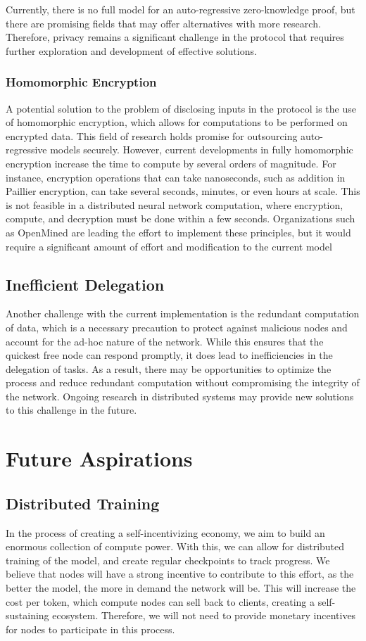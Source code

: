 \documentclass{article}
\begin{document}
Currently, there is no full model for an auto-regressive zero-knowledge proof, but there are promising fields that may offer alternatives with more research. 
Therefore, privacy remains a significant challenge in the protocol that requires further exploration and development of effective solutions.
\subsubsection{Homomorphic Encryption}
A potential solution to the problem of disclosing inputs in the protocol is the use of homomorphic encryption, which allows for computations to be performed on encrypted data. 
This field of research holds promise for outsourcing auto-regressive models securely. 
However, current developments in fully homomorphic encryption increase the time to compute by several orders of magnitude. 
For instance, encryption operations that can take nanoseconds, such as addition in Paillier encryption, can take several seconds, minutes, or even hours at scale. 
This is not feasible in a distributed neural network computation, where encryption, compute, and decryption must be done within a few seconds. 
Organizations such as OpenMined are leading the effort to implement these principles, but it would require a significant amount of effort and modification to the current model
\subsection{Inefficient Delegation}
Another challenge with the current implementation is the redundant computation of data, which is a necessary precaution to protect against malicious nodes and account for the ad-hoc nature of the network. 
While this ensures that the quickest free node can respond promptly, it does lead to inefficiencies in the delegation of tasks. 
As a result, there may be opportunities to optimize the process and reduce redundant computation without compromising the integrity of the network. Ongoing research in distributed systems may provide new solutions to this challenge in the future.

\section {Future Aspirations}
\subsection{Distributed Training}
In the process of creating a self-incentivizing economy, we aim to build an enormous collection of compute power. 
With this, we can allow for distributed training of the model, and create regular checkpoints to track progress. 
We believe that nodes will have a strong incentive to contribute to this effort, as the better the model, the more in demand the network will be. 
This will increase the cost per token, which compute nodes can sell back to clients, creating a self-sustaining ecosystem. 
Therefore, we will not need to provide monetary incentives for nodes to participate in this process.
\end{document}

